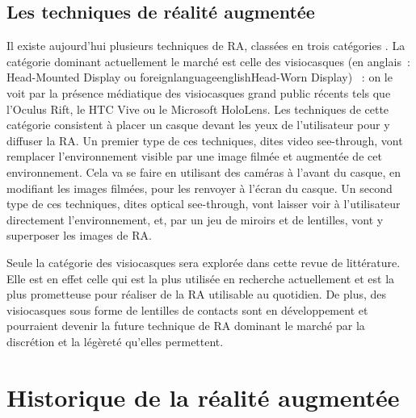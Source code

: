 \subsection*{Les techniques de réalité augmentée}
Il existe aujourd'hui plusieurs techniques de RA, classées en trois catégories . La catégorie dominant actuellement le marché est celle des visiocasques (en anglais~: \foreignlanguage{english}{Head-Mounted Display} ou foreignlanguage{english}{Head-Worn Display}) \citep{VanKrevelenPoelman2010}~: on le voit par la présence médiatique des visiocasques grand public récents tels que l'Oculus Rift, le HTC Vive ou le Microsoft HoloLens. Les techniques de cette catégorie consistent à placer un casque devant les yeux de l'utilisateur pour y diffuser la RA. Un premier type de ces techniques, dites \foreignlanguage{english}{video see-through}, vont remplacer l'environnement visible par une image filmée et augmentée de cet environnement. Cela va se faire en utilisant des caméras à l'avant du casque, en modifiant les images filmées, pour les renvoyer à l'écran du casque. Un second type de ces techniques, dites \foreignlanguage{english}{optical see-through}, vont laisser voir à l'utilisateur directement l'environnement, et, par un jeu de miroirs et de lentilles, vont y superposer les images de RA.


Seule la catégorie des visiocasques sera explorée dans cette revue de littérature. Elle est en effet celle qui est la plus utilisée en recherche actuellement et est la plus prometteuse pour réaliser de la RA utilisable au quotidien. \cite{CarmignianiFurhtAnisettiEtAl2011} De plus, des visiocasques sous forme de lentilles de contacts sont en développement et pourraient devenir la future technique de RA dominant le marché par la discrétion et la légèreté qu'elles permettent. \citep{VanKrevelenPoelman2010}



\section*{Historique de la réalité augmentée}
